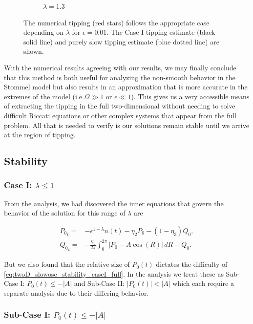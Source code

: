 \begin{figure}[H]
\begin{subfigure}{.5\textwidth}
  \caption{$\lambda=1.3$}
\end{subfigure}
\caption{The numerical tipping (red stars) follows the appropriate case depending on $\lambda$ for $\epsilon=0.01$. The Case I tipping estimate (black solid line) and purely slow tipping estimate (blue dotted line) are shown.}
\label{fig:twoD_slowosc_epscomp}
\end{figure}

With the numerical results agreeing with our results, we may finally conclude that this method is both useful for analyzing the non-smooth behavior in the Stommel model but also results in an approximation that is more accurate in the extremes of the model (i.e $\Omega \gg 1$ or $\epsilon \ll 1$). This gives us a very accessible means of extracting the tipping in the full two-dimensional without needing to solve difficult Riccati equations or other complex systems that appear from the full problem. All that is needed to verify is our solutions remain stable until we arrive at the region of tipping.

\subsection{Stability}

\subsubsection{Case I: $\lambda\le 1$}

From the analysis, we had discovered the inner equations that govern the behavior of the solution for this range of $\lambda$ are

\begin{equation}\label{eq:twoD_slowosc_stability_caseI_full}
\begin{aligned}
{P_0}_t =& -\epsilon^{1-\lambda} n(t)-\eta_2 P_0 -(1-\eta_3)Q_0,\\
{Q_0}_t =& -\frac{\eta_1}{2\pi}\int_0^{2\pi}|P_0-A\cos(R)|\,dR - Q_0.
\end{aligned}
\end{equation}

But we also found that the relative size of $P_0(t)$ dictates the difficulty of \eqref{eq:twoD_slowosc_stability_caseI_full}. In the analysis we treat these as Sub-Case I: $P_0(t)\le-|A|$ and Sub-Case II: $|P_0(t)|<|A|$ which each require a separate analysis due to their differing behavior.

\subsubsection{Sub-Case I: $P_0(t)\le-|A|$}

